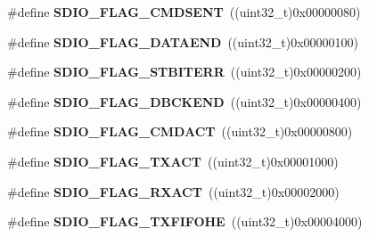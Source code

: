 \begin{DoxyCompactItemize}
\item 
\hypertarget{group___s_d_i_o___flags_gac81f3837aac17a6aed7310a8ea460f17}{\#define {\bfseries S\-D\-I\-O\-\_\-\-F\-L\-A\-G\-\_\-\-C\-M\-D\-S\-E\-N\-T}~((uint32\-\_\-t)0x00000080)}\label{group___s_d_i_o___flags_gac81f3837aac17a6aed7310a8ea460f17}

\item 
\hypertarget{group___s_d_i_o___flags_gaaacb2f6207c149e05f8bdd70e5d49926}{\#define {\bfseries S\-D\-I\-O\-\_\-\-F\-L\-A\-G\-\_\-\-D\-A\-T\-A\-E\-N\-D}~((uint32\-\_\-t)0x00000100)}\label{group___s_d_i_o___flags_gaaacb2f6207c149e05f8bdd70e5d49926}

\item 
\hypertarget{group___s_d_i_o___flags_gae83f7cb3fa1183898131f3de47c2333e}{\#define {\bfseries S\-D\-I\-O\-\_\-\-F\-L\-A\-G\-\_\-\-S\-T\-B\-I\-T\-E\-R\-R}~((uint32\-\_\-t)0x00000200)}\label{group___s_d_i_o___flags_gae83f7cb3fa1183898131f3de47c2333e}

\item 
\hypertarget{group___s_d_i_o___flags_ga5452d8033567821709bd7d5f06547b70}{\#define {\bfseries S\-D\-I\-O\-\_\-\-F\-L\-A\-G\-\_\-\-D\-B\-C\-K\-E\-N\-D}~((uint32\-\_\-t)0x00000400)}\label{group___s_d_i_o___flags_ga5452d8033567821709bd7d5f06547b70}

\item 
\hypertarget{group___s_d_i_o___flags_gad12a9b2bd30e7b907cbabfd92fc645b3}{\#define {\bfseries S\-D\-I\-O\-\_\-\-F\-L\-A\-G\-\_\-\-C\-M\-D\-A\-C\-T}~((uint32\-\_\-t)0x00000800)}\label{group___s_d_i_o___flags_gad12a9b2bd30e7b907cbabfd92fc645b3}

\item 
\hypertarget{group___s_d_i_o___flags_gad5d075c98012586b169ec131aab2eeb5}{\#define {\bfseries S\-D\-I\-O\-\_\-\-F\-L\-A\-G\-\_\-\-T\-X\-A\-C\-T}~((uint32\-\_\-t)0x00001000)}\label{group___s_d_i_o___flags_gad5d075c98012586b169ec131aab2eeb5}

\item 
\hypertarget{group___s_d_i_o___flags_gacc935dd830338970890a05922dff8ab7}{\#define {\bfseries S\-D\-I\-O\-\_\-\-F\-L\-A\-G\-\_\-\-R\-X\-A\-C\-T}~((uint32\-\_\-t)0x00002000)}\label{group___s_d_i_o___flags_gacc935dd830338970890a05922dff8ab7}

\item 
\hypertarget{group___s_d_i_o___flags_gae9277461d3c8984dc31af318e2df1959}{\#define {\bfseries S\-D\-I\-O\-\_\-\-F\-L\-A\-G\-\_\-\-T\-X\-F\-I\-F\-O\-H\-E}~((uint32\-\_\-t)0x00004000)}\label{group___s_d_i_o___flags_gae9277461d3c8984dc31af318e2df1959}


\end{DoxyCompactItemize}
